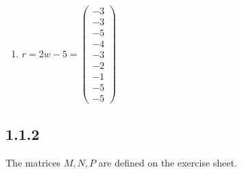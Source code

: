 \documentclass[12pt]{article}
\begin{document}
\begin{enumerate}[a]
	\item %
	$r = 2w - 5 =
	\begin{pmatrix}
		-3\\ -3\\ -5\\ -4\\ -3\\ -2\\ -1\\ -5\\ -5
	\end{pmatrix}$
\end{enumerate}

\subsection*{1.1.2}
The matrices $M, N, P$ are defined on the exercise sheet.
\end{document}
